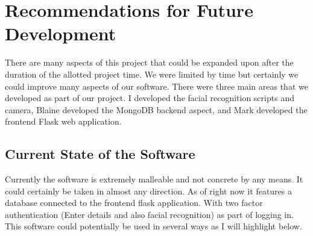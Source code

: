 \documentclass{article}
\begin{document}
\section{Recommendations for Future Development}
There are many aspects of this project that could be expanded upon after the duration of the allotted project time. We were limited by time but certainly we could improve many aspects of our software. There were three main areas that we developed as part of our project. I developed the facial recognition scripts and camera, Blaine developed the MongoDB backend aspect\cite{mongodb}, and Mark developed the frontend Flask web application.\cite{flask}
\\
\subsection{Current State of the Software}
Currently the software is extremely malleable and not concrete by any means. It could certainly be taken in almost any direction. As of right now it features a database connected to the frontend flask application. With two factor authentication (Enter details and also facial recognition) as part of logging in. This software could potentially be used in several ways as I will highlight below.
\end{document}
